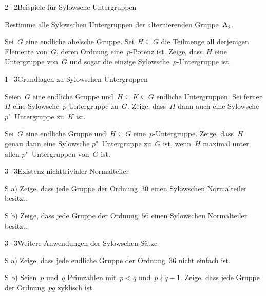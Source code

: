 \documentclass{algblatt}
\begin{document}

\begin{aufgabeE}{2+2}{Beispiele für Sylowsche Untergruppen}
\item
Bestimme alle Sylowschen Untergruppen der alternierenden Gruppe~$\mathrm{A}_4$.
\item
Sei~$G$ eine endliche abelsche Gruppe. Sei~$H \subseteq G$ die
Teilmenge all derjenigen Elemente von~$G$, deren Ordnung eine~$p$-Potenz ist.
Zeige, dass~$H$ eine Untergruppe von~$G$ und sogar die einzige
Sylowsche~$p$-Untergruppe ist.
\end{aufgabeE}

\begin{aufgabeE}{1+3}{Grundlagen zu Sylowschen Untergruppen}
\item Seien~$G$ eine endliche Gruppe und~$H \subseteq K \subseteq G$ endliche
Untergruppen. Sei ferner $H$ eine Sylowsche~$p$-Untergruppe zu~$G$. Zeige,
dass~$H$ dann auch eine Sylowsche $p$"~Untergruppe zu~$K$ ist.
\item Sei~$G$ eine endliche Gruppe und~$H \subseteq G$ eine~$p$-Untergruppe.
Zeige, dass~$H$ genau dann
eine Sylowsche $p$"~Untergruppe zu~$G$ ist, wenn~$H$ maximal unter
allen $p$"~Untergruppen von~$G$ ist.
\end{aufgabeE}

\begin{aufgabeE}{3+3}{Existenz nichttrivialer Normalteiler}
\item[S a)] Zeige, dass jede Gruppe der Ordnung~$30$ einen
Sylowschen Normalteiler besitzt.
\item[S b)] Zeige, dass jede Gruppe der Ordnung~$56$ einen
Sylowschen Normalteiler besitzt.
\end{aufgabeE}

\begin{aufgabeE}{3+3}{Weitere Anwendungen der Sylowschen Sätze}
\item[S a)] Zeige, dass jede endliche Gruppe der Ordnung~$36$ nicht einfach ist.
\item[S b)] Seien~$p$ und~$q$ Primzahlen mit~$p < q$ und~$p \nmid q-1$. Zeige,
dass jede Gruppe der Ordnung~$pq$ zyklisch ist.
\end{aufgabeE}
\end{document}
